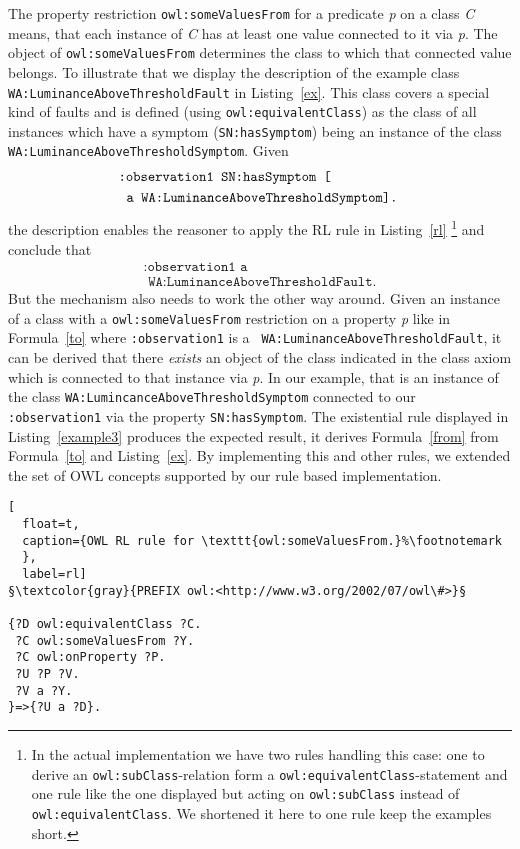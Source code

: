 The property restriction \texttt{owl:someValuesFrom} for a predicate \emph{p} on a class \emph{C} means, that each instance of \emph{C} 
has at least one value connected to it via \emph{p}. 
The object of \texttt{owl:someValuesFrom} determines the class to which 
that connected value belongs.
To illustrate that we display the description of the example class \texttt{WA:LuminanceAboveThresholdFault} in Listing~\ref{ex}. 
This class covers a special kind of faults and is defined (using \texttt{owl:equivalentClass}) as the 
class of all instances which have a symptom (\texttt{SN:hasSymptom}) being an instance of the class \texttt{WA:LuminanceAboveThresholdSymptom}.  
Given
\begin{align}\label{from}
&\hspace{-0.1cm}\texttt{:observation1 SN:hasSymptom [}\notag\\&\hspace{0.1cm}\texttt{a WA:LuminanceAboveThresholdSymptom].}
\end{align}
the description enables the reasoner to apply the RL rule in Listing~\ref{rl} \footnote{
  In the actual implementation we have two rules handling this case: one to derive an \texttt{owl:subClass}-relation form a \texttt{owl:equivalentClass}-statement
  and one rule like the one displayed but acting on \texttt{owl:subClass} instead of \texttt{owl:equivalentClass}.
  We shortened it here to one rule keep the examples short.
 } and conclude that
\begin{multline}\label{to} \texttt{:observation1 a}\\\texttt{ WA:LuminanceAboveThresholdFault.}%
\end{multline}
But the mechanism also needs to work the other way around. 
Given an instance of a class with a  \texttt{owl:someValuesFrom} restriction on a property \emph{p}  like in 
Formula~\ref{to} where \texttt{:observation1} is a \texttt{ WA:LuminanceAboveThresholdFault}, it can be derived that there \emph{exists} an 
object 
of the class indicated in the class axiom which is connected to that instance via \emph{p}. 
In our example, that is an instance of the class \texttt{WA:LumincanceAboveThresholdSymptom} connected to our \texttt{:observation1} via the property \texttt{SN:hasSymptom}. 
The existential rule displayed in Listing~\ref{example3} produces the expected result, it derives Formula~\ref{from} from Formula~\ref{to} and Listing~\ref{ex}.  
By implementing this and other rules, we extended the set of OWL  concepts supported by our rule based implementation.
\begin{lstlisting}[
  float=t,
  caption={OWL RL rule for \texttt{owl:someValuesFrom.}%\footnotemark
  },
  label=rl]
§\textcolor{gray}{PREFIX owl:<http://www.w3.org/2002/07/owl\#>}§

{?D owl:equivalentClass ?C.
 ?C owl:someValuesFrom ?Y. 
 ?C owl:onProperty ?P. 
 ?U ?P ?V.
 ?V a ?Y.
}=>{?U a ?D}.
 \end{lstlisting}



